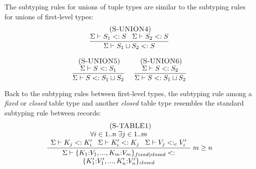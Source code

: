 \documentclass{sigplanconf}
\newcommand{\mylabel}[1]{\; (\textsc{#1})}
\newcommand{\senv}{\Sigma}
\newcommand{\subtype}{<:}
\begin{document}
The subtyping rules for unions of tuple types are similar to the
subtyping rules for unions of first-level types:
\[
\begin{array}{c}
\begin{array}{c}
\mylabel{S-UNION4}\\
\dfrac{\senv \vdash S_{1} \subtype S \;\;\;
       \senv \vdash S_{2} \subtype S}
      {\senv \vdash S_{1} \sqcup S_{2} \subtype S}
\end{array}
\\ \\
\begin{array}{c}
\mylabel{S-UNION5}\\
\dfrac{\senv \vdash S \subtype S_{1}}
      {\senv \vdash S \subtype S_{1} \sqcup S_{2}}
\end{array}
\;
\begin{array}{c}
\mylabel{S-UNION6}\\
\dfrac{\senv \vdash S \subtype S_{2}}
      {\senv \vdash S \subtype S_{1} \sqcup S_{2}}
\end{array}
\end{array}
\]

Back to the subtyping rules between first-level types,
the subtyping rule among a \emph{fixed} or \emph{closed}
table type and another \emph{closed} table type resembles the
standard subtyping rule between records:
\[
\begin{array}{c}
\mylabel{S-TABLE1}\\
\dfrac{\begin{array}{c}
       \forall i \in 1..n \; \exists j \in 1..m \\
       \senv \vdash K_{j} \subtype K_{i}' \;\;\;
       \senv \vdash K_{i}' \subtype K_{j} \;\;\;
       \senv \vdash V_{j} \subtype_{c} V_{i}'
       \end{array}}
      {\begin{array}{c}
       \senv \vdash \{K_{1}{:}V_{1}, ..., K_{m}{:}V_{m}\}_{fixed|closed} \subtype\\
                    \{K_{1}'{:}V_{1}', ..., K_{n}'{:}V_{n}'\}_{closed}
       \end{array}} \; m \ge n
\end{array}
\]
\end{document}

